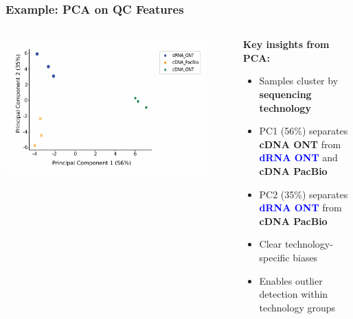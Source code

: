 \documentclass[aspectratio=169]{beamer}
\begin{document}
\begin{frame}
  \frametitle{Example: PCA on QC Features}
  \begin{columns}[T]
    \begin{column}{0.55\textwidth}
      \centering
      \includegraphics[width=0.9\textwidth]{figures/Genome Res_figure2_a.jpg}
    \end{column}
    \begin{column}{0.4\textwidth}
      \small
      \textbf{Key insights from PCA:}
      \begin{itemize}
        \item Samples cluster by \textbf{sequencing technology}
        \item PC1 (56\%) separates \textcolor{green!60!black}{\textbf{cDNA ONT}} from \textcolor{blue}{\textbf{dRNA ONT}} and \textcolor{longtrec-orange}{\textbf{cDNA PacBio}}
        \item PC2 (35\%) separates \textcolor{blue}{\textbf{dRNA ONT}} from \textcolor{longtrec-orange}{\textbf{cDNA PacBio}}
        \item Clear technology-specific biases
        \item Enables outlier detection within technology groups
      \end{itemize}
      
      \vspace{0.3cm}
      \scriptsize
    \end{column}
  \end{columns}
\end{frame}
\end{document}
